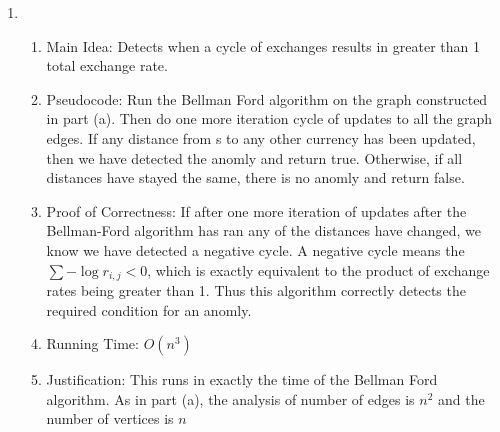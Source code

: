 \documentclass[11pt]{article}
\newenvironment{qparts}{\begin{enumerate}[{(}a{)}]}{\end{enumerate}}
\begin{document}
\begin{qparts}
\item
\begin{enumerate}
\item Main Idea: Detects when a cycle of exchanges results in greater than 1 total exchange rate. 
\item Pseudocode: Run the Bellman Ford algorithm on the graph constructed in part (a). Then do one more iteration cycle of updates to all the graph edges. If any distance from s to any other currency has been updated, then we have detected the anomly and return true. Otherwise, if all distances have stayed the same, there is no anomly and return false.
\item Proof of Correctness: If after one more iteration of updates after the Bellman-Ford algorithm has ran any of the distances have changed, we know we have detected a negative cycle. A negative cycle means the $\sum - \log {r_{i,j}} < 0$, which is exactly equivalent to the product of exchange rates being greater than 1. Thus this algorithm correctly detects the required condition for an anomly. 
\item Running Time: $O(n^3)$
\item Justification: This runs in exactly the time of the Bellman Ford algorithm. As in part (a), the analysis of number of edges is $n^2$ and the number of vertices is $n$
\end{enumerate}

\end{qparts}


\newpage
\end{document}
